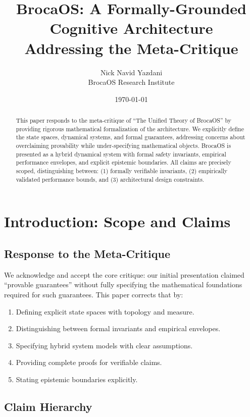 \documentclass[12pt]{article}
\title{BrocaOS: A Formally-Grounded Cognitive Architecture\\ Addressing the Meta-Critique}
\author{Nick Navid Yazdani\\BrocaOS Research Institute}
\date{\today}
\theoremstyle{definition}
\begin{document}
\maketitle

\begin{abstract}
This paper responds to the meta-critique of ``The Unified Theory of BrocaOS'' by providing rigorous mathematical formalization of the architecture. We explicitly define the state spaces, dynamical systems, and formal guarantees, addressing concerns about overclaiming provability while under-specifying mathematical objects. BrocaOS is presented as a hybrid dynamical system with formal safety invariants, empirical performance envelopes, and explicit epistemic boundaries. All claims are precisely scoped, distinguishing between: (1) formally verifiable invariants, (2) empirically validated performance bounds, and (3) architectural design constraints.
\end{abstract}

\section{Introduction: Scope and Claims}

\subsection{Response to the Meta-Critique}

We acknowledge and accept the core critique: our initial presentation claimed ``provable guarantees'' without fully specifying the mathematical foundations required for such guarantees. This paper corrects that by:

\begin{enumerate}
    \item Defining explicit state spaces with topology and measure.
    \item Distinguishing between formal invariants and empirical envelopes.
    \item Specifying hybrid system models with clear assumptions.
    \item Providing complete proofs for verifiable claims.
    \item Stating epistemic boundaries explicitly.
\end{enumerate}

\subsection{Claim Hierarchy}
\end{document}
